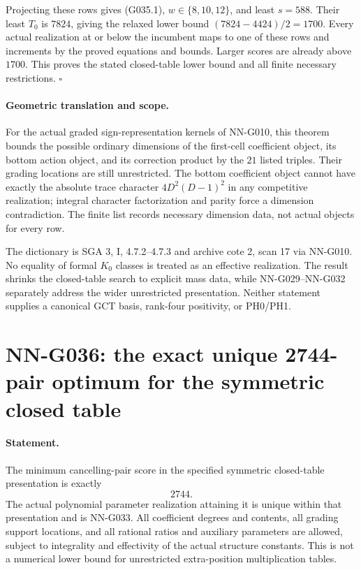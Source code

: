 Projecting these rows gives (G035.1), $w\in\{8,10,12\}$,
and least $s=588$. Their least $T_0$ is $7824$, giving
the relaxed lower bound $(7824-4424)/2=1700$.
Every actual realization at or below the incumbent
maps to one of these rows and increments by the
proved equations and bounds. Larger scores are already
above $1700$. This proves the stated closed-table
lower bound and all finite necessary restrictions.
\hfill$\square$

\paragraph{Geometric translation and scope.}
For the actual graded sign-representation kernels of
NN-G010, this theorem bounds the possible ordinary
dimensions of the first-cell coefficient object, its
bottom action object, and its correction product by
the $21$ listed triples. Their grading locations are
still unrestricted. The bottom coefficient object
cannot have exactly the absolute trace character
$4D^2(D-1)^2$ in any competitive realization; integral
character factorization and parity force a dimension
contradiction. The finite list records necessary
dimension data, not actual objects for every row.

The dictionary is SGA 3, I, 4.7.2--4.7.3 and archive
cote 2, scan 17 via NN-G010. No equality of formal
$K_0$ classes is treated as an effective realization.
The result shrinks the closed-table search to explicit
mass data, while NN-G029--NN-G032 separately address
the wider unrestricted presentation. Neither statement
supplies a canonical GCT basis, rank-four positivity,
or PH0/PH1.




\section{NN-G036: the exact unique 2744-pair optimum for the symmetric closed table}
\paragraph{Statement.}
The minimum cancelling-pair score in the specified symmetric
closed-table presentation is exactly
\[
                                2744.                \tag{G036.1}
\]
The actual polynomial parameter realization attaining it is
unique within that presentation and is NN-G033.
All coefficient degrees and contents, all grading support
locations, and all rational ratios and auxiliary parameters
are allowed, subject to integrality and effectivity of the
actual structure constants. This is not a numerical lower
bound for unrestricted extra-position multiplication tables.

